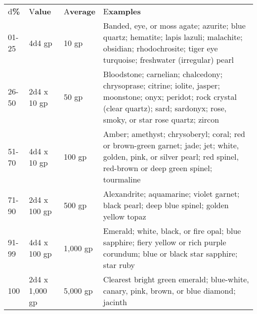\documentclass{article}
\begin{document}
\vspace{12pt}
\begin{tabular}{|>{\raggedright}p{21pt}|>{\raggedright}p{42pt}|>{\raggedright}p{26pt}|>{\raggedright}p{211pt}|}
\hline
\multicolumn{4}{|p{302pt}|}{T\textbf{able: Gems}}\tabularnewline
\hline
d\textbf{\%} & V\textbf{alue} & A\textbf{verage} & E\textbf{xamples}\tabularnewline
\hline
01-25 & 4d4 gp & 10 gp & Banded, eye, or moss agate; azurite; blue quartz; hematite; 
lapis lazuli; malachite; obsidian; rhodochrosite; tiger eye turquoise; freshwater 
(irregular) pearl\tabularnewline
\hline
26-50 & 2d4 x 10 gp & 50 gp & Bloodstone; carnelian; chalcedony; chrysoprase; citrine; 
iolite, jasper; moonstone; onyx; peridot; rock crystal (clear quartz); sard; sardonyx; 
rose, smoky, or star rose quartz; zircon\tabularnewline
\hline
51-70 & 4d4 x 10 gp & 100 gp & Amber; amethyst; chrysoberyl; coral; red or brown-green 
garnet; jade; jet; white, golden, pink, or silver pearl; red spinel, red-brown 
or deep green spinel; tourmaline\tabularnewline
\hline
71-90 & 2d4 x 100 gp & 500 gp & Alexandrite; aquamarine; violet garnet; black pearl; 
deep blue spinel; golden yellow topaz\tabularnewline
\hline
91-99 & 4d4 x 100 gp & 1,000 gp & Emerald; white, black, or fire opal; blue sapphire; 
fiery yellow or rich purple corundum; blue or black star sapphire; star ruby\tabularnewline
\hline
100 & 2d4 x 1,000 gp & 5,000 gp & Clearest bright green emerald; blue-white, canary, 
pink, brown, or blue diamond; jacinth\tabularnewline
\hline
\end{tabular}
\end{document}
